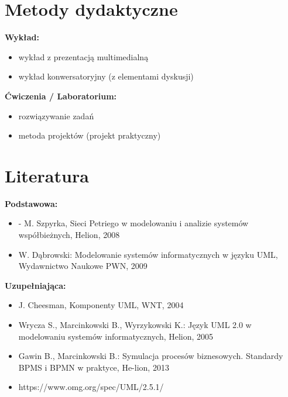 \documentclass[12pt, a4paper]{article}
\begin{document}
\section{Metody dydaktyczne}

\textbf{Wykład:}
\begin{itemize}
  \item wykład z prezentacją multimedialną
  \item wykład konwersatoryjny (z elementami dyskusji)
\end{itemize}
\vspace{4pt}
\textbf{Ćwiczenia / Laboratorium:}
\begin{itemize}
  \item rozwiązywanie zadań
  \item metoda projektów (projekt praktyczny)
\end{itemize}
\vspace{4pt}


\section{Literatura}

\textbf{Podstawowa:}
\begin{itemize}
  \item - M. Szpyrka, Sieci Petriego w modelowaniu i analizie systemów współbieżnych, Helion, 2008
  \item W. Dąbrowski: Modelowanie systemów informatycznych w języku UML, Wydawnictwo Naukowe PWN, 2009
\end{itemize}

\textbf{Uzupełniająca:}
\begin{itemize}
  \item J. Cheesman, Komponenty UML, WNT, 2004
  \item Wrycza S., Marcinkowski B., Wyrzykowski K.: Język UML 2.0 w modelowaniu systemów informatycznych, Helion, 2005
  \item Gawin B., Marcinkowski B.: Symulacja procesów biznesowych. Standardy BPMS i BPMN w praktyce, He-lion, 2013
  \item https://www.omg.org/spec/UML/2.5.1/
\end{itemize}
\end{document}
